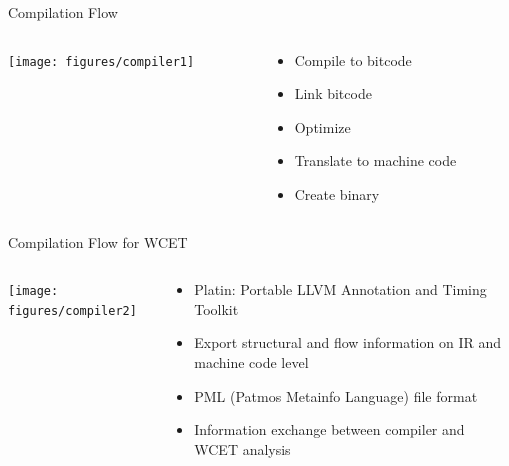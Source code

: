 \documentclass[17pt]{beamer}
\begin{document}
\begin{frame}{Compilation Flow}
  \begin{columns}
    \begin{column}{.55\textwidth}
      \texttt{[image: figures/compiler1]}      
    \end{column}
    \begin{column}{.45\textwidth}
      \begin{itemize}
      \item Compile to bitcode
      \item Link bitcode
      \item Optimize
      \item Translate to machine code
      \item Create binary
      \end{itemize}
    \end{column}
  \end{columns}
\end{frame}

\begin{frame}[shrink=30]{Compilation Flow for WCET}
  \begin{columns}
    \begin{column}{.55\textwidth}
      \texttt{[image: figures/compiler2]}      
    \end{column}
    \begin{column}{.45\textwidth}
      \begin{itemize}
      \item Platin: Portable LLVM Annotation and Timing Toolkit
      \item Export structural and flow information on IR and machine
        code level
      \item PML (Patmos Metainfo Language) file format
      \item Information exchange between compiler and WCET analysis
      \end{itemize}
    \end{column}    
  \end{columns}
\end{frame}
\end{document}
